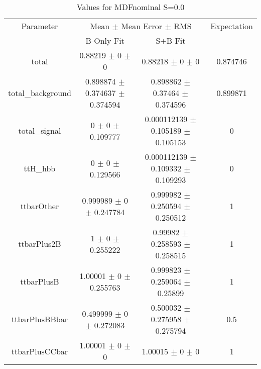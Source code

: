 \begin{table}
\centering
\caption{Values for MDFnominal S=0.0}
\begin{tabular}{cccc}
\toprule
Parameter & \multicolumn{2}{c}{Mean $\pm$ Mean Error $\pm$ RMS} & Expectation\\
 & B-Only Fit & S+B Fit & \\
\midrule
total & \num{0.88219} $\pm$ \num{0} $\pm$ \num{0} & \num{0.88218} $\pm$ \num{0} $\pm$ \num{0} & \num{0.874746}\\
total\_background & \num{0.898874} $\pm$ \num{0.374637} $\pm$ \num{0.374594} & \num{0.898862} $\pm$ \num{0.37464} $\pm$ \num{0.374596} & \num{0.899871}\\
total\_signal & \num{0} $\pm$ \num{0} $\pm$ \num{0.109777} & \num{0.000112139} $\pm$ \num{0.105189} $\pm$ \num{0.105153} & \num{0}\\
ttH\_hbb & \num{0} $\pm$ \num{0} $\pm$ \num{0.129566} & \num{0.000112139} $\pm$ \num{0.109332} $\pm$ \num{0.109293} & \num{0}\\
ttbarOther & \num{0.999989} $\pm$ \num{0} $\pm$ \num{0.247784} & \num{0.999982} $\pm$ \num{0.250594} $\pm$ \num{0.250512} & \num{1}\\
ttbarPlus2B & \num{1} $\pm$ \num{0} $\pm$ \num{0.255222} & \num{0.99982} $\pm$ \num{0.258593} $\pm$ \num{0.258515} & \num{1}\\
ttbarPlusB & \num{1.00001} $\pm$ \num{0} $\pm$ \num{0.255763} & \num{0.999823} $\pm$ \num{0.259064} $\pm$ \num{0.25899} & \num{1}\\
ttbarPlusBBbar & \num{0.499999} $\pm$ \num{0} $\pm$ \num{0.272083} & \num{0.500032} $\pm$ \num{0.275958} $\pm$ \num{0.275794} & \num{0.5}\\
ttbarPlusCCbar & \num{1.00001} $\pm$ \num{0} $\pm$ \num{0} & \num{1.00015} $\pm$ \num{0} $\pm$ \num{0} & \num{1}\\
\bottomrule
\end{tabular}
\end{table}